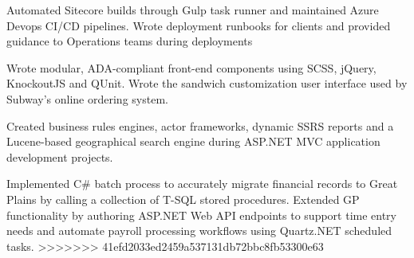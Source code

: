 \begin{cventries}
{\begin{cvitems}
		\item {Automated Sitecore builds through Gulp task runner and maintained Azure Devops CI/CD pipelines. Wrote deployment runbooks for clients and provided guidance to Operations teams during deployments}
		\item {Wrote modular, ADA-compliant front-end components using SCSS, jQuery, KnockoutJS and QUnit. Wrote the sandwich customization user interface used by Subway’s online ordering system.}
		\item {Created business rules engines, actor frameworks, dynamic SSRS reports and a Lucene-based geographical search engine during ASP.NET MVC application development projects.}
		\item {Implemented C# batch process to accurately migrate financial records to Great Plains by calling a collection of T-SQL stored procedures. Extended GP functionality by authoring ASP.NET Web API endpoints to support time entry needs and automate payroll processing workflows using Quartz.NET scheduled tasks.}
>>>>>>> 41efd2033ed2459a537131db72bbc8fb53300e63
      \end{cvitems}
    }


\end{cventries}
